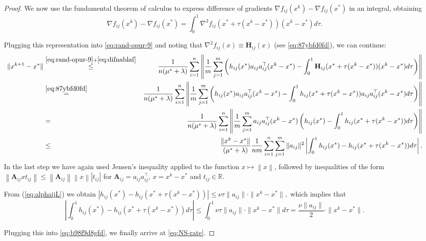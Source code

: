 \documentclass[10pt]{article}
\newcommand{\R}{\mathbb{R}}
\newcommand{\norm}[1]{\left\|#1\right\|}
\newcommand{\newalpha}{h}
\newcommand{\mA}{\mathbf{A}}
\newcommand{\mH}{\mathbf{H}}
\begin{document}
\begin{proof}
{We now use the fundamental theorem of calculus to express difference of gradients $\nabla f_{ij}(x^k) - \nabla f_{ij}(x^*)$ in an integral, obtaining
\begin{equation}\label{eq:difnablaf}
\nabla f_{ij}(x^k) - \nabla f_{ij}(x^*) = \int_{0}^1 \nabla^2 f_{ij}(x^* + \tau (x^k-x^*)) (x^k-x^*) d\tau. 
\end{equation}

Plugging this representation into	\eqref{eq:rand-opur-9} and noting that $ \nabla^2 f_{ij}(x)\equiv \mH_{ij}(x)$ (see \eqref{eq:87ybfd0fd}), we can continue:
\begin{eqnarray}	
	\|x^{k+1} - x^*\| 	& \overset{\eqref{eq:rand-opur-9}+\eqref{eq:difnablaf}}{ \leq} & \frac{1}{n (\mu^*+\lambda)} \sum_{i=1}^n \left\|   \frac{1}{m}  \sum_{j=1}^{m} \left(  \newalpha_{ij}(x^*) a_{ij}a_{ij}^\top (x^k - x^*) -  \int_{0}^1 \mH_{ij} (x^* + \tau(x^k - x^*)) (x^k - x^*)d\tau  \right)   \right\|  \notag \\ 
	&\overset{\eqref{eq:87ybfd0fd}}{=}& \frac{1}{n (\mu^*+\lambda)} \sum_{i=1}^n  \left\| \frac{1}{m} \sum_{j=1}^{m} \left(  \newalpha_{ij}(x^*) a_{ij}a_{ij}^\top (x^k - x^*)  -  \int_{0}^1 \newalpha_{ij} (x^* + \tau(x^k - x^*))a_{ij}a_{ij}^\top (x^k - x^*)d\tau  \right)   \right\| \notag  \\ 
	&=& \frac{1}{n (\mu^*+\lambda)} \sum_{i=1}^n  \left\| \frac{1}{m} \sum_{j=1}^{m}  a_{ij}a_{ij}^\top (x^k - x^*) \left( \newalpha_{ij}(x^*) - \int_{0}^1 \newalpha_{ij}(x^* + \tau(x^k - x^*))  d\tau \right) \right\|  \notag \\ 
	&\leq& \frac{ \|x^k - x^*\|}{ (\mu^*+\lambda)} \frac{1}{nm}\sum_{i=1}^n \sum_{j=1}^{m} \|a_{ij}\|^2 \left|   \int_{0}^1  \newalpha_{ij}(x^*) - \newalpha_{ij}(x^* + \tau(x^k - x^*))  d\tau  \right|. \label{eq:b98f9d8gfd}
\end{eqnarray}
In the last step we have again used Jensen's inequality applied to the function $x\mapsto \norm{x}$, followed by  inequalities of the form $\norm{\mA_{ij} x t_{ij}} \leq \norm{\mA_{ij}} \norm{x} |t_{ij}|$ for $\mA_{ij} = a_{ij}a_{ij}^\top $, $x=x^k-x^*$ and $t_{ij}\in \R$.

From (\ref{eq:alphaijL})  we obtain
$
| \newalpha_{ij}(x^*) - \newalpha_{ij}(x^* + \tau(x^k - x^*))| \leq \nu \tau \|a_{ij}\| \cdot \|x^k - x^*\|, 
$
which implies that 
$$
\left|   \int_{0}^1  \newalpha_{ij}(x^*) - \newalpha_{ij}(x^* + \tau(x^k - x^*))  d\tau  \right| \leq \int_{0}^1 \nu \tau \|a_{ij}\| \cdot \|x^k - x^*\| d\tau = \frac{\nu \|a_{ij}\|}{2} \cdot \|x^k - x^*\|. 
$$

Plugging this into \eqref{eq:b98f9d8gfd}, we finally arrive at \eqref{eq:NS-rate}.
}
\end{proof}
\end{document}
